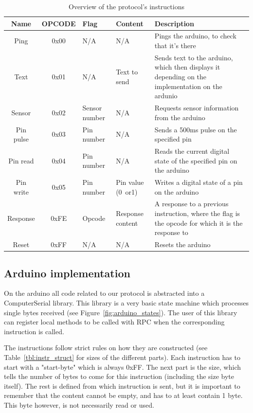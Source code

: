 \begin{table}
	\begin{tabular}{ | c | c | p{1.5cm} | p{1.7cm} | p{6cm} |}
		\hline
		\textbf{Name} & \textbf{OPCODE} & \textbf{Flag} & \textbf{Content} & \textbf{Description} \\ \hline
		Ping & 0x00 & N/A & N/A & Pings the arduino, to check that it's there \\ \hline
		Text & 0x01 & N/A & Text to send & Sends text to the arduino, which then displays it depending on the implementation on the ardunio \\ \hline
		Sensor & 0x02 & Sensor number & N/A & Requests sensor information from the arduino \\ \hline
		Pin pulse & 0x03 & Pin number & N/A & Sends a 500ms pulse on the specified pin \\ \hline
		Pin read & 0x04 & Pin number & N/A & Reads the current digital state of the specified pin on the arduino \\ \hline
		Pin write & 0x05 & Pin number & Pin value (0~or1) & Writes a digital state of a pin on the arduino \\ \hline
		Response & 0xFE & Opcode & Response content & A response to a previous instruction, where the flag is the opcode for which it is the response to \\ \hline
		Reset & 0xFF & N/A & N/A & Resets the arduino \\ \hline
	\end{tabular}
	\caption{Overview of the protocol's instructions}
	\label{tbl:opcodes}
\end{table}

\subsection{Arduino implementation}
On the arduino all code related to our protocol is abstracted into a ComputerSerial library. This library is a very basic state machine which processes single bytes received (see Figure~\ref{fig:arduino_states}). The user of this library can register local methods to be called with RPC when the corresponding instruction is called.

The instructions follow strict rules on how they are constructed (see Table~\ref{tbl:instr_struct} for sizes of the different parts). Each instruction has to start with a "start-byte" which is always 0xFF. The next part is the size, which tells the number of bytes to come for this instruction (including the size byte itself). The rest is defined from which instruction is sent, but it is important to remember that the content cannot be empty, and has to at least contain 1 byte. This byte however, is not necessarily read or used.

